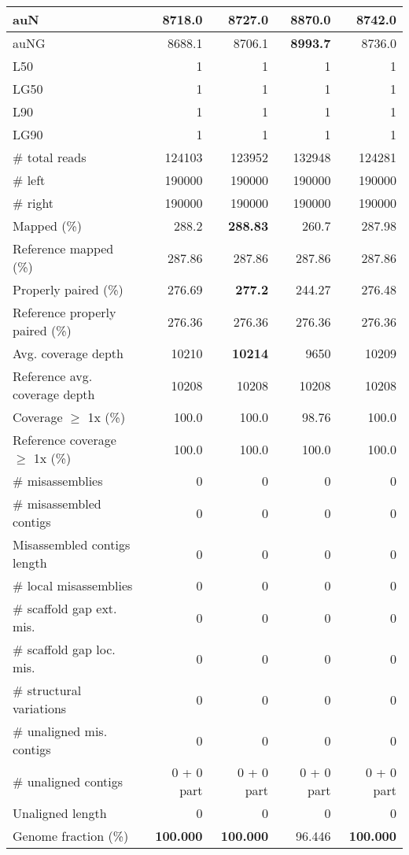\documentclass[12pt,a4paper]{article}
\begin{document}
\begin{table}[ht]
\begin{center}
\begin{tabular}{|l*{4}{|r}|}
auN & 8718.0 & 8727.0 & {\bf 8870.0} & 8742.0 \\ \hline
auNG & 8688.1 & 8706.1 & {\bf 8993.7} & 8736.0 \\ \hline
L50 & 1 & 1 & 1 & 1 \\ \hline
LG50 & 1 & 1 & 1 & 1 \\ \hline
L90 & 1 & 1 & 1 & 1 \\ \hline
LG90 & 1 & 1 & 1 & 1 \\ \hline
\# total reads & 124103 & 123952 & 132948 & 124281 \\ \hline
\# left & 190000 & 190000 & 190000 & 190000 \\ \hline
\# right & 190000 & 190000 & 190000 & 190000 \\ \hline
Mapped (\%) & 288.2 & {\bf 288.83} & 260.7 & 287.98 \\ \hline
Reference mapped (\%) & 287.86 & 287.86 & 287.86 & 287.86 \\ \hline
Properly paired (\%) & 276.69 & {\bf 277.2} & 244.27 & 276.48 \\ \hline
Reference properly paired (\%) & 276.36 & 276.36 & 276.36 & 276.36 \\ \hline
Avg. coverage depth & 10210 & {\bf 10214} & 9650 & 10209 \\ \hline
Reference avg. coverage depth & 10208 & 10208 & 10208 & 10208 \\ \hline
Coverage $\geq$ 1x (\%) & 100.0 & 100.0 & 98.76 & 100.0 \\ \hline
Reference coverage $\geq$ 1x (\%) & 100.0 & 100.0 & 100.0 & 100.0 \\ \hline
\# misassemblies & 0 & 0 & 0 & 0 \\ \hline
\# misassembled contigs & 0 & 0 & 0 & 0 \\ \hline
Misassembled contigs length & 0 & 0 & 0 & 0 \\ \hline
\# local misassemblies & 0 & 0 & 0 & 0 \\ \hline
\# scaffold gap ext. mis. & 0 & 0 & 0 & 0 \\ \hline
\# scaffold gap loc. mis. & 0 & 0 & 0 & 0 \\ \hline
\# structural variations & 0 & 0 & 0 & 0 \\ \hline
\# unaligned mis. contigs & 0 & 0 & 0 & 0 \\ \hline
\# unaligned contigs & 0 + 0 part & 0 + 0 part & 0 + 0 part & 0 + 0 part \\ \hline
Unaligned length & 0 & 0 & 0 & 0 \\ \hline
Genome fraction (\%) & {\bf 100.000} & {\bf 100.000} & 96.446 & {\bf 100.000} \\ \hline

\end{tabular}
\end{center}
\end{table}
\end{document}
